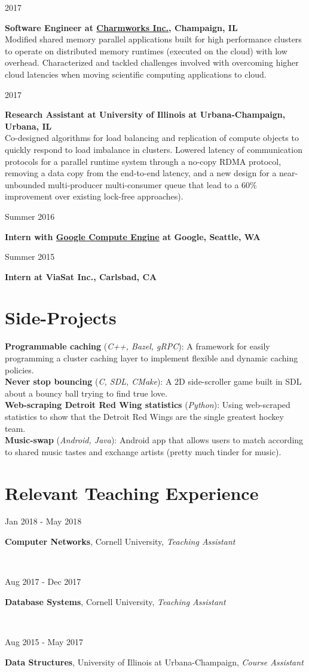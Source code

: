 \documentclass[10pt]{article}
\newcommand{\teachblock}[2]{
\begin{minipage}[t]{0.20\textwidth}
\vspace*{0.4em}
\begin{flushright}#2\end{flushright}
\end{minipage}
\hfill\vline\hfill
\begin{minipage}[t]{0.76\textwidth}
\vspace*{0.4em}
	#1
\end{minipage}
\vspace{0.2em}
}
\newcommand{\workblockempty}[2]{
\begin{minipage}[t]{0.14\textwidth}
\vspace*{0.4em}
\begin{flushright}#2\end{flushright}
\end{minipage}
\hfill\vline\hfill
\begin{minipage}[t]{0.82\textwidth}
\vspace*{0.4em}
	\textbf{#1}
\end{minipage}
\vspace{0.1em}
}
\newcommand{\workblocktwo}[3]{
\begin{minipage}[t]{0.14\textwidth}
\vspace*{0.4em}
\begin{flushright}#2\end{flushright}
\end{minipage}
\hfill\vline\hfill
\begin{minipage}[t]{0.82\textwidth}
\vspace*{0.4em}
	\textbf{#1} \\
    #3
\end{minipage}
\vspace{0.7em}
}
\begin{document}
\workblocktwo{Software Engineer at \href{http://www.charmplusplus.com/}{Charmworks Inc.}, Champaign, IL}{2017}{
Modified shared memory parallel applications built for high performance clusters to operate on distributed memory runtimes (executed on the cloud) with low overhead. Characterized and tackled challenges involved with overcoming higher cloud latencies when moving scientific computing applications to cloud.}

\workblocktwo{Research Assistant at University of Illinois at Urbana-Champaign, Urbana, IL}{2017}{
	Co-designed algorithms for load balancing and replication of compute objects to
	quickly respond to load imbalance in clusters. Lowered latency of communication protocols for a parallel runtime system through a no-copy RDMA protocol, removing a data copy from the end-to-end latency, and a new design for a near-unbounded multi-producer multi-consumer queue that lead to a 60\% improvement over existing lock-free approaches).
}

\workblockempty{Intern with \href{https://cloud.google.com/compute/}{Google Compute Engine} at Google, Seattle, WA}{Summer 2016}

\workblockempty{Intern at ViaSat Inc., Carlsbad, CA}{Summer 2015}

\vspace{-0.4em}

\section{Side-Projects}
\textbf{Programmable caching} (\textit{C++, Bazel, gRPC}): A framework for easily programming a cluster caching layer to implement flexible and dynamic caching policies. \\
\textbf{Never stop bouncing} (\textit{C, SDL, CMake}): A 2D side-scroller game built in SDL about a bouncy ball trying to find true love. \\
\textbf{Web-scraping Detroit Red Wing statistics} (\textit{Python}): Using web-scraped statistics to show that the Detroit Red Wings are the single greatest hockey team. \\
\textbf{Music-swap} (\textit{Android, Java}): Android app that allows users to match according to shared music tastes and exchange artists (pretty much tinder for music).

\vspace{-0.4em}

\section{Relevant Teaching Experience}
\vspace{-0.8em}
\teachblock{\textbf{Computer Networks}, Cornell University, \textit{Teaching Assistant}}{Jan 2018 - May 2018} \\
\teachblock{\textbf{Database Systems}, Cornell University, \textit{Teaching Assistant}}{Aug 2017 - Dec 2017} \\
\teachblock{\textbf{Data Structures}, University of Illinois at Urbana-Champaign, \textit{Course Assistant}}{Aug 2015 - May 2017}
\end{document}
